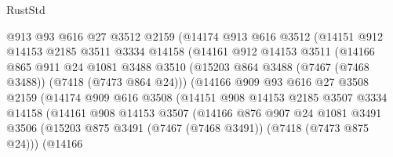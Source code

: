 \begin{lexlean}{RustStd}
\begin{coremodule}
                        @913
                        @93
                        @616
                        @27
                        @3512
                        @2159
                        (@14174
                          @913
                          @616
                          @3512
                          (@14151
                            @912
                            @14153
                            @2185
                            @3511
                            @3334
                            @14158
                            (@14161
                              @912
                              @14153
                              @3511
                              (@14166
                                @865
                                @911
                                @24
                                @1081
                                @3488
                                @3510
                                (@15203 @864 @3488 (@7467 (@7468 @3488)) (@7418 (@7473 @864 @24)))
                                (@14166
                                  @909
                                  @93
                                  @616
                                  @27
                                  @3508
                                  @2159
                                  (@14174
                                    @909
                                    @616
                                    @3508
                                    (@14151
                                      @908
                                      @14153
                                      @2185
                                      @3507
                                      @3334
                                      @14158
                                      (@14161
                                        @908
                                        @14153
                                        @3507
                                        (@14166
                                          @876
                                          @907
                                          @24
                                          @1081
                                          @3491
                                          @3506
                                          (@15203
                                            @875
                                            @3491
                                            (@7467 (@7468 @3491))
                                            (@7418 (@7473 @875 @24)))
                                          (@14166

\end{coremodule}
\end{lexlean}
